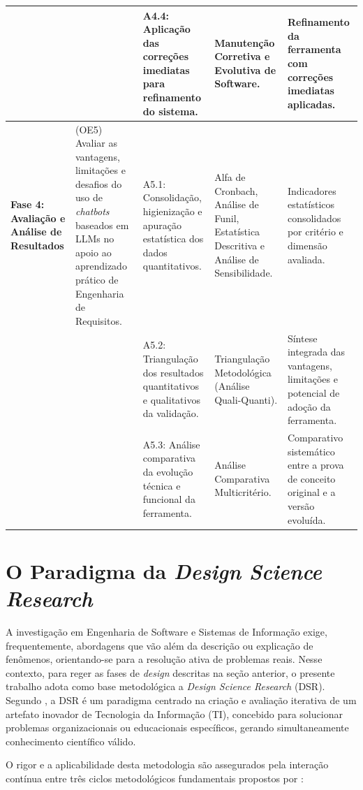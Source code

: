 {\begin{xltabular}{\textwidth}{|p{1.8cm}|p{4.2cm}|X|X|X|}
    & & 
    A4.4: Aplicação das correções imediatas para refinamento do sistema. & 
    Manutenção Corretiva e Evolutiva de Software. & 
    Refinamento da ferramenta com correções imediatas aplicadas. \\
    \midrule
    
    \textbf{Fase 4: Avaliação e Análise de Resultados} & 
    (OE5) Avaliar as vantagens, limitações e desafios do uso de \textit{chatbots} baseados em LLMs no apoio ao aprendizado prático de Engenharia de Requisitos. & 
    A5.1: Consolidação, higienização e apuração estatística dos dados quantitativos. & 
    Alfa de Cronbach, Análise de Funil, Estatística Descritiva e Análise de Sensibilidade. & 
    Indicadores estatísticos consolidados por critério e dimensão avaliada. \\
    
    & & 
    A5.2: Triangulação dos resultados quantitativos e qualitativos da validação. & 
    Triangulação Metodológica (Análise Quali-Quanti). & 
    Síntese integrada das vantagens, limitações e potencial de adoção da ferramenta. \\
    
    & & 
    A5.3: Análise comparativa da evolução técnica e funcional da ferramenta. & 
    Análise Comparativa Multicritério. & 
    Comparativo sistemático entre a prova de conceito original e a versão evoluída. \\
\end{xltabular}
}

\section{O Paradigma da \textit{Design Science Research}}
\label{sec:dsr}

A investigação em Engenharia de Software e Sistemas de Informação exige, frequentemente, abordagens que vão além da descrição ou explicação de fenômenos, orientando-se para a resolução ativa de problemas reais. Nesse contexto, para reger as fases de \textit{design} descritas na seção anterior, o presente trabalho adota como base metodológica a \textit{Design Science Research} (DSR). Segundo , a DSR é um paradigma centrado na criação e avaliação iterativa de um artefato inovador de Tecnologia da Informação (TI), concebido para solucionar problemas organizacionais ou educacionais específicos, gerando simultaneamente conhecimento científico válido.

O rigor e a aplicabilidade desta metodologia são assegurados pela interação contínua entre três ciclos metodológicos fundamentais propostos por :

